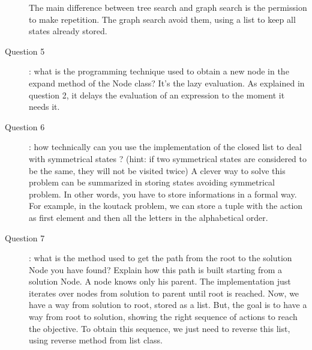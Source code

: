 \begin{description}
The main difference between tree search and graph search is the permission to make repetition. The graph search avoid them, using a list to keep all states already stored.
\item[Question 5]: what is the programming technique used to obtain a new node in the expand method of the Node class? \newline
It's the lazy evaluation. As explained in question 2, it delays the evaluation of an expression to the moment it needs it. 
\item[Question 6]: how technically can you use the implementation of the closed list to deal with symmetrical states ? (hint: if two symmetrical states are considered to be the same, they will not be visited twice) \newline
A clever way to solve this problem can be summarized in storing states avoiding symmetrical problem. In other words, you have to store informations in a formal way. For example, in the koutack problem, we can store a tuple with the action as first element and then all the letters in the alphabetical order.
\item[Question 7]: what is the method used to get the path from the root to the solution Node you have found? Explain how this path is built starting from a solution Node.
A node knows only his parent. The implementation just iterates over nodes from solution to parent until root is reached. Now, we have a way from solution to root, stored as a list. But, the goal is to have a way from root to solution, showing the right sequence of actions to reach the objective. To obtain this sequence, we just need to reverse this list, using reverse method from list class.
\end{description} 
